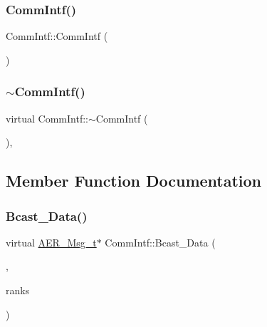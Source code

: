 \subsubsection{\texorpdfstring{Comm\+Intf()}{CommIntf()}}
{\footnotesize\ttfamily Comm\+Intf\+::\+Comm\+Intf (\begin{DoxyParamCaption}{ }\end{DoxyParamCaption})\hspace{0.3cm}{\ttfamily [inline]}}

\mbox{\label{classCommIntf_a036b261d1e2ff312a278f6498fe396f8}} 
\subsubsection{\texorpdfstring{$\sim$\+Comm\+Intf()}{~CommIntf()}}
{\footnotesize\ttfamily virtual Comm\+Intf\+::$\sim$\+Comm\+Intf (\begin{DoxyParamCaption}{ }\end{DoxyParamCaption})\hspace{0.3cm}{\ttfamily [inline]}, {\ttfamily [virtual]}}



\subsection{Member Function Documentation}
\mbox{\label{classCommIntf_a9ed907991869cc7b6ebac4688d085147}} 
\subsubsection{\texorpdfstring{Bcast\+\_\+\+Data()}{Bcast\_Data()}}
{\footnotesize\ttfamily virtual \mbox{\hyperlink{structAER__Msg__t}{A\+E\+R\+\_\+\+Msg\+\_\+t}}$\ast$ Comm\+Intf\+::\+Bcast\+\_\+\+Data (\begin{DoxyParamCaption}\item[{\mbox{\hyperlink{structAER__Msg__t}{A\+E\+R\+\_\+\+Msg\+\_\+t}} const \&}]{,  }\item[{std\+::vector$<$ int $>$}]{ranks }\end{DoxyParamCaption})\hspace{0.3cm}{\ttfamily [pure virtual]}}



